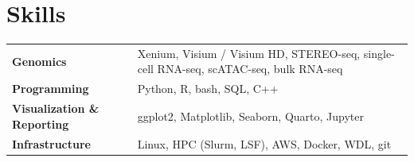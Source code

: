 \documentclass[letterpaper,10pt]{article}
\begin{document}
\section{Skills}
{\small
\begin{tabularx}{\textwidth}{@{}p{1.75in}X@{}}
  \textbf{Genomics} & Xenium, Visium / Visium HD, STEREO-seq, single-cell RNA-seq, scATAC-seq, bulk RNA-seq \\[2pt]
  \textbf{Programming} & Python, R, bash, SQL, C++ \\[2pt]
  \textbf{Visualization \& Reporting} & ggplot2, Matplotlib, Seaborn, Quarto, Jupyter \\[2pt]
  \textbf{Infrastructure} & Linux, HPC (Slurm, LSF), AWS, Docker, WDL, git \\
\end{tabularx}}

\end{document}
